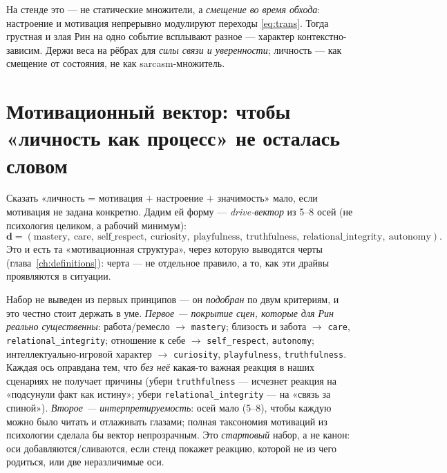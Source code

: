 На стенде это — не статические множители, а \emph{смещение во время обхода}:
настроение и мотивация непрерывно модулируют переходы \eqref{eq:trans}. Тогда
грустная и злая Рин на одно событие всплывают разное — характер контекстно-зависим.
Держи веса на рёбрах для \emph{силы связи и уверенности}; личность — как смещение от
состояния, не как sarcasm-множитель.

\section{Мотивационный вектор: чтобы «личность как процесс» не осталась словом}
\label{sec:drives}

Сказать «личность = мотивация $+$ настроение $+$ значимость» мало, если мотивация не
задана конкретно. Дадим ей форму — \emph{drive-вектор} из 5--8 осей (не психология
целиком, а рабочий минимум):
\[
\mathbf{d} = (\text{mastery},\ \text{care},\ \text{self\_respect},\ \text{curiosity},\
\text{playfulness},\ \text{truthfulness},\ \text{relational\_integrity},\ \text{autonomy}).
\]
Это и есть та «мотивационная структура», через которую выводятся черты
(глава~\ref{ch:definitions}): черта — не отдельное правило, а то, как эти драйвы
проявляются в ситуации.

\begin{openq}
Набор не выведен из первых принципов — он \emph{подобран} по двум критериям, и это
честно стоит держать в уме. \emph{Первое — покрытие сцен, которые для Рин реально
существенны}: работа/ремесло $\to$ \texttt{mastery}; близость и забота $\to$
\texttt{care}, \texttt{relational\_integrity}; отношение к себе $\to$
\texttt{self\_respect}, \texttt{autonomy}; интеллектуально-игровой характер $\to$
\texttt{curiosity}, \texttt{playfulness}, \texttt{truthfulness}. Каждая ось
оправдана тем, что \emph{без неё} какая-то важная реакция в наших сценариях не
получает причины (убери \texttt{truthfulness} — исчезнет реакция на «подсунули факт
как истину»; убери \texttt{relational\_integrity} — на «связь за спиной»).
\emph{Второе — интерпретируемость}: осей мало (5--8), чтобы каждую можно было читать
и отлаживать глазами; полная таксономия мотиваций из психологии сделала бы вектор
непрозрачным. Это \emph{стартовый} набор, а не канон: оси добавляются/сливаются, если
стенд покажет реакцию, которой не из чего родиться, или две неразличимые оси.
\end{openq}

